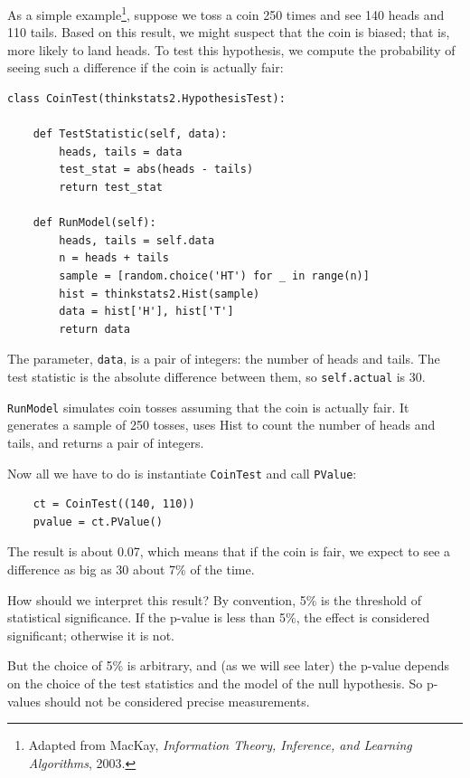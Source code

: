 \documentclass[12pt]{book}
\begin{document}
As a simple example\footnote{Adapted from MacKay, {\it Information
    Theory, Inference, and Learning Algorithms}, 2003.}, suppose we
toss a coin 250 times and see 140 heads and 110 tails.  Based on this
result, we might suspect that the coin is biased; that is, more likely
to land heads.  To test this hypothesis, we compute the
probability of seeing such a difference if the coin is actually
fair:

\begin{verbatim}
class CoinTest(thinkstats2.HypothesisTest):

    def TestStatistic(self, data):
        heads, tails = data
        test_stat = abs(heads - tails)
        return test_stat

    def RunModel(self):
        heads, tails = self.data
        n = heads + tails
        sample = [random.choice('HT') for _ in range(n)]
        hist = thinkstats2.Hist(sample)
        data = hist['H'], hist['T']
        return data
\end{verbatim}

The parameter, {\tt data}, is a pair of
integers: the number of heads and tails.  The test statistic is
the absolute difference between them, so {\tt self.actual}
is 30.

{\tt RunModel} simulates coin tosses assuming that the coin is
actually fair.  It generates a sample of 250 tosses, uses Hist
to count the number of heads and tails, and returns a pair of
integers.

Now all we have to do is instantiate {\tt CoinTest} and call
{\tt PValue}:

\begin{verbatim}
    ct = CoinTest((140, 110))
    pvalue = ct.PValue()
\end{verbatim}

The result is about 0.07, which means that if the coin is
fair, we expect to see a difference as big as 30 about 7\% of the
time.

How should we interpret this result?  By convention,
5\% is the threshold of statistical significance.  If the
p-value is less than 5\%, the effect is considered significant; otherwise
it is not.
 

But the choice of 5\% is arbitrary, and (as we will see later) the
p-value depends on the choice of the test statistics and
the model of the null hypothesis.  So p-values should not be considered
precise measurements.
\end{document}

